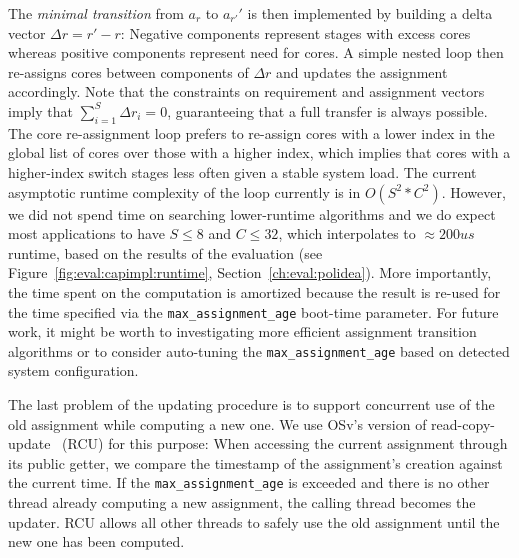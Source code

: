 \documentclass[12pt,a4paper]{book}
\begin{document}
The \emph{minimal transition} from $a_r$ to $a_{r'}'$ is then implemented by building a delta vector ${\Delta r = r' - r}$:
Negative components represent stages with excess cores whereas positive components represent need for cores.
A simple nested loop then re-assigns cores between components of $\Delta r$ and updates the assignment accordingly.
Note that the constraints on requirement and assignment vectors imply that ${\sum_{i = 1}^{S} \Delta r_i = 0}$, guaranteeing that a full transfer is always possible.
The core re-assignment loop prefers to re-assign cores with a lower index in the global list of cores over those with a higher index, which implies that cores with a higher-index switch stages less often given a stable system load.
The current asymptotic runtime complexity of the loop currently is in $O(S^2 * C^2)$.
However, we did not spend time on searching lower-runtime algorithms and we do expect most applications to have $S \le 8$ and $C \le 32$, which interpolates to $\approx 200us$ runtime, based on the results of the evaluation (see Figure~\ref{fig:eval:capimpl:runtime}, Section~\ref{ch:eval:polidea}). %
More importantly, the time spent on the computation is amortized because the result is re-used for the time specified via the \lstinline[style=figurecpp]{max_assignment_age} boot-time parameter.
For future work, it might be worth to investigating more efficient assignment transition algorithms or to consider auto-tuning the \lstinline[style=figurecpp]{max_assignment_age} based on detected system configuration.

The last problem of the updating procedure is to support concurrent use of the old assignment while computing a new one.
We use OSv's version of read-copy-update~\cite{readCopyUpdate} (RCU) for this purpose:
When accessing the current assignment through its public getter, we compare the timestamp of the assignment's creation against the current time.
If the \lstinline[style=figurecpp]{max_assignment_age} is exceeded and there is no other thread already computing a new assignment, the calling thread becomes the updater.
RCU allows all other threads to safely use the old assignment until the new one has been computed.
\end{document}
